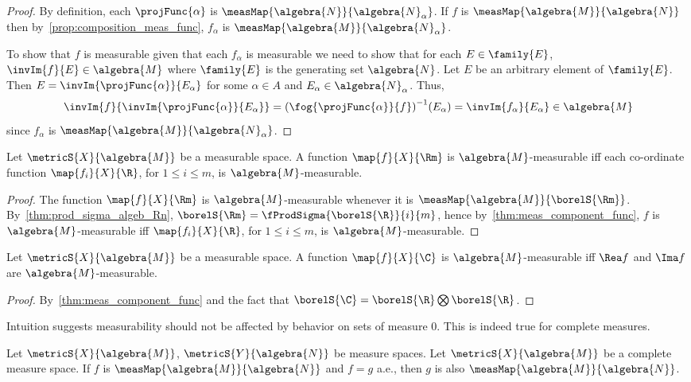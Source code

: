 \begin{proof}
    By definition, each $\projFunc{\alpha}$ is $\measMap{\algebra{N}}{\algebra{N}_{\alpha}}$. If $f$ 
    is $\measMap{\algebra{M}}{\algebra{N}}$ then by~\ref{prop:composition_meas_func}, $f_{\alpha}$ is 
    $\measMap{\algebra{M}}{\algebra{N}_{\alpha}}$.

    To show that $f$ is measurable given that each $f_{\alpha}$ is measurable we need to show that for each
    $E\in \family{E}$, $\invIm{f}{E}\in \algebra{M}$ where $\family{E}$ is the generating set $\algebra{N}$.
    Let $E$ be an arbitrary element of $\family{E}$. Then $E = \invIm{\projFunc{\alpha}}{E_{\alpha}}$ for some
    $\alpha \in A$ and $E_{\alpha} \in \algebra{N}_{\alpha}$. Thus,
    \[\invIm{f}{\invIm{\projFunc{\alpha}}{E_{\alpha}}} = {(\fog{\projFunc{\alpha}}{f})}^{-1}(E_{\alpha}) =
	\invIm{f_{\alpha}}{E_{\alpha}} \in \algebra{M}\]
    since $f_{\alpha}$ is $\measMap{\algebra{M}}{\algebra{N}_{\alpha}}$.
\end{proof}
\begin{Corollary}
    Let $\metricS{X}{\algebra{M}}$ be a measurable space. A function $\map{f}{X}{\Rm}$ is 
    $\algebra{M}$-measurable 
    iff each co-ordinate function $\map{f_{i}}{X}{\R}$, for $1\leq i \leq m$, is $\algebra{M}$-measurable.
\end{Corollary}
\begin{proof}
     The function $\map{f}{X}{\Rm}$ is $\algebra{M}$-measurable whenever it is
    $\measMap{\algebra{M}}{\borelS{\Rm}}$. By~\ref{thm:prod_sigma_algeb_Rn}, $\borelS{\Rm} =
    \fProdSigma{\borelS{\R}}{i}{m}$, hence by~\ref{thm:meas_component_func}, $f$ is $\algebra{M}$-measurable iff
    $\map{f_{i}}{X}{\R}$, for $1\leq i \leq m$, is $\algebra{M}$-measurable.
\end{proof}
\begin{Corollary}
    Let $\metricS{X}{\algebra{M}}$ be a measurable space. A function $\map{f}{X}{\C}$ is
    $\algebra{M}$-measurable iff $\Rea f$ and $\Ima f$ are $\algebra{M}$-measurable.
\end{Corollary}
\begin{proof}
    By~\ref{thm:meas_component_func} and the fact that $\borelS{\C} = \borelS{\R}\bigotimes\borelS{\R}$.
\end{proof}
Intuition suggests measurability should not be affected by behavior on sets of measure $0$. This is indeed
true for complete measures.
\begin{Proposition}\label{prop:ae_equality_meas_func}
    Let $\metricS{X}{\algebra{M}}$, $\metricS{Y}{\algebra{N}}$ be measure spaces. Let $\metricS{X}{\algebra{M}}$
    be a complete measure space. If $f$ is $\measMap{\algebra{M}}{\algebra{N}}$ and $f=g$ a.e., then $g$ is
    also $\measMap{\algebra{M}}{\algebra{N}}$.
\end{Proposition}
